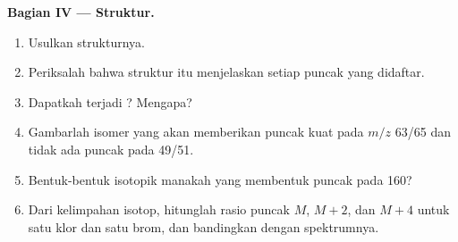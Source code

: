 \begin{problem}
\medskip
\noindent\textbf{Bagian IV --- Struktur.}
\begin{enumerate}[resume]
  \item Usulkan strukturnya.
  \item Periksalah bahwa struktur itu menjelaskan setiap puncak yang didaftar.
  \item Dapatkah terjadi ? Mengapa?
  \item Gambarlah isomer yang akan memberikan puncak kuat pada $m/z$ 63/65 dan tidak ada puncak pada 49/51.
  \item Bentuk-bentuk isotopik manakah yang membentuk puncak pada 160?
  \item Dari kelimpahan isotop, hitunglah rasio puncak $M$, $M+2$, dan $M+4$
        untuk satu klor dan satu brom, dan bandingkan dengan spektrumnya.
\end{enumerate}
\end{problem}
